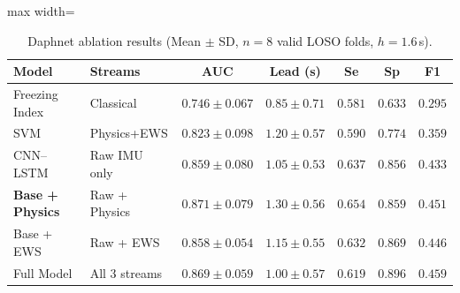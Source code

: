 \documentclass[12pt,a4paper,oneside]{report}
\numberwithin{equation}{chapter}
\numberwithin{figure}{chapter}
\numberwithin{table}{chapter}
\begin{document}
\begin{table}[ht]
\centering
\caption{Daphnet ablation results (Mean $\pm$ SD, $n=8$ valid LOSO folds, $h=1.6$\,s).}
\label{tab:ablation}
\renewcommand{\arraystretch}{1.25}
\begin{adjustbox}{max width=\textwidth}
\begin{tabular}{llccccc}
\toprule
\textbf{Model} & \textbf{Streams} & \textbf{AUC} & \textbf{Lead (s)} & \textbf{Se} & \textbf{Sp} & \textbf{F1} \\
\midrule
Freezing Index & Classical & $0.746\!\pm\!0.067$ & $0.85\!\pm\!0.71$ & $0.581$ & $0.633$ & $0.295$ \\
SVM            & Physics+EWS & $0.823\!\pm\!0.098$ & $1.20\!\pm\!0.57$ & $0.590$ & $0.774$ & $0.359$ \\
\midrule
CNN--LSTM      & Raw IMU only  & $0.859\!\pm\!0.080$ & $1.05\!\pm\!0.53$ & $0.637$ & $0.856$ & $0.433$ \\
\textbf{Base + Physics} & Raw + Physics & $\mathbf{0.871\!\pm\!0.079}$ & $\mathbf{1.30\!\pm\!0.56}$ & $\mathbf{0.654}$ & $0.859$ & $0.451$ \\
Base + EWS     & Raw + EWS     & $0.858\!\pm\!0.054$ & $1.15\!\pm\!0.55$ & $0.632$ & $0.869$ & $0.446$ \\
Full Model     & All 3 streams & $0.869\!\pm\!0.059$ & $1.00\!\pm\!0.57$ & $0.619$ & $\mathbf{0.896}$ & $\mathbf{0.459}$ \\
\bottomrule
\end{tabular}
\end{adjustbox}
\end{table}
\end{document}
